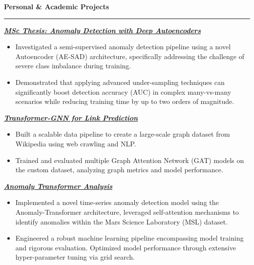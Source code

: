 \documentclass[9pt, a4paper]{article}
\newcommand{\cvsection}[1]{%
	\vspace{2pt}\par
	{\Large\bfseries\color{sectionblue}#1}\par
	\vspace{2pt}\hrule\vspace{6pt}
}
\newcommand{\cvproject}[1]{%
	\par {\large{\bfseries{\textit{#1}}}} \par \vspace{4pt}
}
\begin{document}
\begin{minipage}[t]{0.67\linewidth}
		\vspace{10pt}\par
		\cvsection{Personal \& Academic Projects}
		
		\cvproject{\href{https://github.com/bGuzzo/msc-ai-ml-thesis-anomaly-detection}{MSc Thesis: Anomaly Detection with Deep Autoencoders}}
		\begin{itemize}[leftmargin=*, nosep]
			\item \footnotesize Investigated a semi-supervised anomaly detection pipeline using a novel Autoencoder (AE-SAD) architecture, specifically addressing the challenge of severe class imbalance during training.
			
			\vspace{2pt}
			\item \footnotesize Demonstrated that applying advanced under-sampling techniques can significantly boost detection accuracy (AUC) in complex many-vs-many scenarios while reducing training time by up to two orders of magnitude.
		\end{itemize}
		
		\vspace{6pt}
		\cvproject{\href{https://github.com/bGuzzo/transformer-gnn-link-prediction}{Transformer-GNN for Link Prediction}}
		\begin{itemize}[leftmargin=*, nosep]
			\item \footnotesize Built a scalable data pipeline to create a large-scale graph dataset from Wikipedia using web crawling and NLP.
			
			\vspace{2pt}
			\item \footnotesize Trained and evaluated multiple Graph Attention Network (GAT) models on the custom dataset, analyzing graph metrics and model performance.
		\end{itemize}
		
		\vspace{6pt}
		\cvproject{\href{https://github.com/bGuzzo/Anomaly-Transformer-Analysis}{Anomaly Transformer Analysis}}
		\begin{itemize}[leftmargin=*, nosep]
			\item \footnotesize Implemented a novel time-series anomaly detection model using the Anomaly-Transformer architecture, leveraged self-attention mechanisms to identify anomalies within the Mars Science Laboratory (MSL) dataset.
			
			\vspace{2pt}
			\item \footnotesize Engineered a robust machine learning pipeline encompassing model training and rigorous evaluation. Optimized model performance through extensive hyper-parameter tuning via grid search.
		\end{itemize}
			

\end{minipage}
\end{document}
